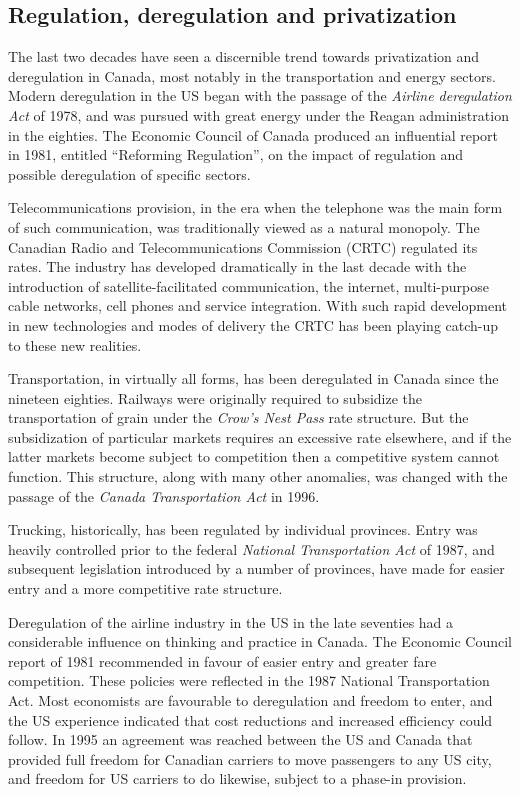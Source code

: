 \subsection*{Regulation, deregulation and privatization}

The last two decades have seen a discernible trend towards privatization and deregulation in Canada, most notably in the transportation and energy sectors. Modern deregulation in the US began with the passage of the \textit{Airline deregulation Act} of 1978, and was pursued with great energy under the Reagan administration in the eighties. The Economic Council of Canada produced an influential report in 1981, entitled ``Reforming Regulation'', on the impact of regulation and possible deregulation of specific sectors.

Telecommunications provision, in the era when the telephone was the main form of such communication, was traditionally viewed as a natural monopoly. The Canadian Radio and Telecommunications Commission (CRTC) regulated its rates. The industry has developed dramatically in the last decade with the introduction of satellite-facilitated communication, the internet, multi-purpose cable networks, cell phones and service integration. With such rapid development in new technologies and modes of delivery the CRTC has been playing catch-up to these new realities.

Transportation, in virtually all forms, has been deregulated in Canada since the nineteen eighties. Railways were originally required to subsidize the transportation of grain under the \textit{Crow's Nest Pass} rate structure. But the subsidization of particular markets requires an excessive rate elsewhere, and if the latter markets become subject to competition then a competitive system cannot function. This structure, along with many other anomalies, was changed with the passage of the \textit{Canada Transportation Act} in 1996. 

Trucking, historically, has been regulated by individual provinces. Entry was heavily controlled prior to the federal \textit{National Transportation Act} of 1987, and subsequent legislation introduced by a number of provinces, have made for easier entry and a more competitive rate structure. 

Deregulation of the airline industry in the US in the late seventies had a considerable influence on thinking and practice in Canada. The Economic Council report of 1981 recommended in favour of easier entry and greater fare competition. These policies were reflected in the 1987 National Transportation Act. Most economists are favourable to deregulation and freedom to enter, and the US experience indicated that cost reductions and increased efficiency could follow. In 1995 an agreement was reached between the US and Canada that provided full freedom for Canadian carriers to move passengers to any US city, and freedom for US carriers to do likewise, subject to a phase-in provision.

